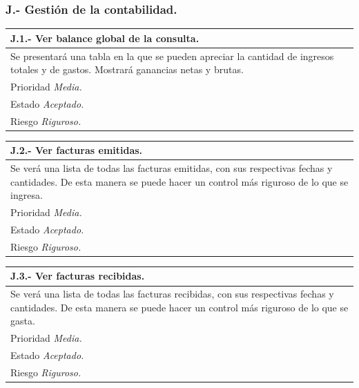 \documentclass[a4paper,oneside,11pt]{book}
\begin{document}
\subsubsection{J.- Gestión de la contabilidad.}

\begin{center}
\begin{tabulary}{15cm}{|L|}
	\hline
		\bf{J.1.- Ver balance global de la consulta.} \\
	\hline
		Se presentará una tabla en la que se pueden apreciar la cantidad de ingresos totales y de gastos. Mostrará ganancias netas y brutas. \\
	\hline
		Prioridad \textit{Media.} \\
	\hline
		Estado \textit{Aceptado.} \\
	\hline
		Riesgo \textit{Riguroso.} \\
	\hline
\end{tabulary}
\end{center}

\begin{center}
\begin{tabulary}{15cm}{|L|}
	\hline
		\bf{J.2.- Ver facturas emitidas.} \\
	\hline
		Se verá una lista de todas las facturas emitidas, con sus respectivas fechas y cantidades. De esta manera se puede hacer un control más riguroso de lo que se ingresa. \\
	\hline
		Prioridad \textit{Media.} \\
	\hline
		Estado \textit{Aceptado.} \\
	\hline
		Riesgo \textit{Riguroso.} \\
	\hline
\end{tabulary}
\end{center}

\begin{center}
\begin{tabulary}{15cm}{|L|}
	\hline
		\bf{J.3.- Ver facturas recibidas.} \\
	\hline
		Se verá una lista de todas las facturas recibidas, con sus respectivas fechas y cantidades. De esta manera se puede hacer un control más riguroso de lo que se gasta. \\
	\hline
		Prioridad \textit{Media.} \\
	\hline
		Estado \textit{Aceptado.} \\
	\hline
		Riesgo \textit{Riguroso.} \\
	\hline
\end{tabulary}
\end{center}
\end{document}
